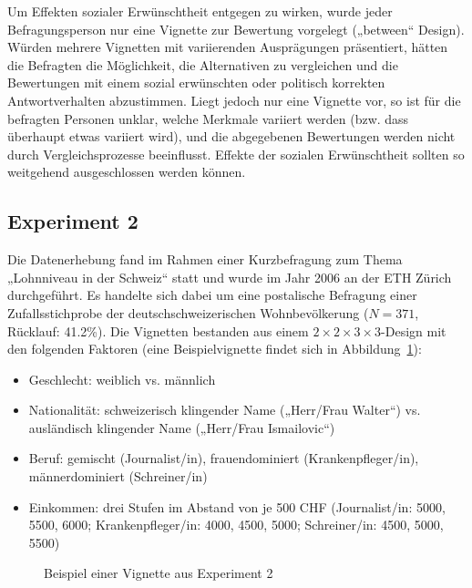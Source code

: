 \documentclass[a4paper,12pt]{article}
\renewcommand{\baselinestretch}{1.1}
\newif\ifcomments
\newcommand{\comment}[1]{%
    \ifcomments\marginpar{\renewcommand{\baselinestretch}{1}\tiny\hspace*{-1.1em}\colorbox{gray!20}%
    {\textcolor{red}{\parbox[t]{.9in}{\raggedright #1}}}}\fi}
\begin{document}
Um Effekten sozialer Erwünschtheit entgegen zu wirken, wurde jeder
Befragungsperson nur eine Vignette zur Bewertung vorgelegt („between“ Design).
Würden mehrere Vignetten mit variierenden Ausprägungen präsentiert, hätten die
Befragten die Möglichkeit, die Alternativen zu vergleichen und die Bewertungen
mit einem sozial erwünschten oder politisch korrekten Antwortverhalten
abzustimmen. Liegt jedoch nur eine Vignette vor, so ist für die befragten
Personen unklar, welche Merkmale variiert werden (bzw. dass überhaupt etwas
variiert wird), und die abgegebenen Bewertungen werden nicht durch
Vergleichsprozesse beeinflusst. Effekte der sozialen Erwünschtheit sollten so
weitgehend ausgeschlossen werden können. 

\subsection{Experiment 2}
Die Datenerhebung fand im Rahmen einer Kurzbefragung zum
Thema „Lohnniveau in der Schweiz“ statt und wurde im Jahr 2006 an der ETH
Zürich durchgeführt. Es handelte sich dabei um eine postalische Befragung einer
Zufallsstichprobe der deutschschweizerischen Wohnbevölkerung ($N = 371$,
Rücklauf: 41.2\%). Die Vignetten bestanden aus einem $2 \times 2 \times 3 \times
3$-Design mit den folgenden Faktoren (eine Beispielvignette findet sich in
Abbildung~\ref{fig-2}): \comment{Tabelle zu Faktoren wie bei Experiment 1}
\begin{itemize}
\item Geschlecht: weiblich vs. männlich
\item Nationalität: schweizerisch klingender Name („Herr/Frau Walter“) vs. ausländisch klingender Name („Herr/Frau Ismailovic“)
\item Beruf: gemischt (Journalist/in), frauendominiert (Krankenpfleger/in), männerdominiert (Schreiner/in)
\item Einkommen: drei Stufen im Abstand von je 500 CHF (Journalist/in: 5000, 5500, 6000; Krankenpfleger/in: 4000, 4500, 5000; 
Schreiner/in: 4500, 5000, 5500)
\end{itemize}

\begin{figure}\centering
    \caption{Beispiel einer Vignette aus Experiment 2}\label{fig-2}
\end{figure}
\end{document}
